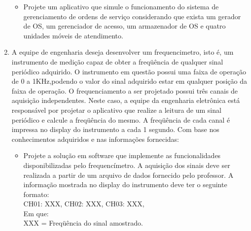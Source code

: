\documentclass[a4paper,10pt]{article}
\begin{document}
\begin{enumerate}
  \begin{itemize}
   \item Projete um aplicativo que simule o funcionamento do sistema de gerenciamento de ordens de serviço considerando que exista um gerador de OS, 
	um gerenciador de acesso, um armazenador de OS e quatro unidades móveis de atendimento.
  \end{itemize}

\newpage

  \item A equipe de engenharia deseja desenvolver um frequencimetro, isto é, um instrumento de medição capaz de obter a freqüência de qualquer sinal 
      periódico adquirido. O instrumento em questão possui uma faixa de operação de 0 a 1KHz,podendo o valor do sinal adquirido estar em qualquer 
      posição da faixa de operação. O frequenciamento a ser projetado possui três canais de aquisição independentes. Neste caso, a equipe da 
      engenharia eletrônica está responsável por projetar o aplicativo que realize a leitura de um sinal periódico e calcule a freqüência do mesmo. 
      A freqüência de cada canal é impressa no display do instrumento a cada 1 segundo. Com base nos conhecimentos adquiridos e nas informações 
      fornecidas:
      \begin{itemize}
       \item Projete a solução em software que implemente as funcionalidades disponibilizadas pelo frequencímetro. A aquisição dos sinais deve ser 
	    realizada a partir de um arquivo de dados fornecido pelo professor. A informação mostrada no display do instrumento deve ter o seguinte 
	    formato:\\
	    CH01: XXX, CH02: XXX, CH03: XXX,\\
	    Em que:\\
	    XXX = Freqüência do sinal amostrado.
      \end{itemize}
  
\newpage


\end{enumerate}
\end{document}

